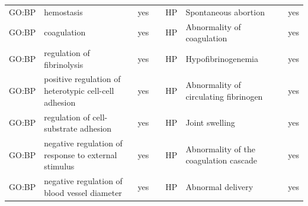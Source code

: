 \begin{longtable}{@{}lp{5cm}lllp{5cm}l@{}}
GO:BP           & hemostasis                                                                                                                         & yes              &           & HP              & Spontaneous abortion                                                                                                                                                   & yes              \\
GO:BP           & coagulation                                                                                                                        & yes              &           & HP              & Abnormality of coagulation                                                                                                                                             & yes              \\
GO:BP           & regulation of fibrinolysis                                                                                                         & yes              &           & HP              & Hypofibrinogenemia                                                                                                                                                     & yes              \\
GO:BP           & positive regulation of heterotypic cell-cell adhesion                                                                              & yes              &           & HP              & Abnormality of circulating fibrinogen                                                                                                                                  & yes              \\
GO:BP           & regulation of cell-substrate adhesion                                                                                              & yes              &           & HP              & Joint swelling                                                                                                                                                         & yes              \\
GO:BP           & negative regulation of response to external stimulus                                                                               & yes              &           & HP              & Abnormality of the coagulation cascade                                                                                                                                 & yes              \\
GO:BP           & negative regulation of blood vessel diameter                                                                                       & yes              &           & HP              & Abnormal delivery                                                                                                                                                      & yes              \\

\end{longtable}
